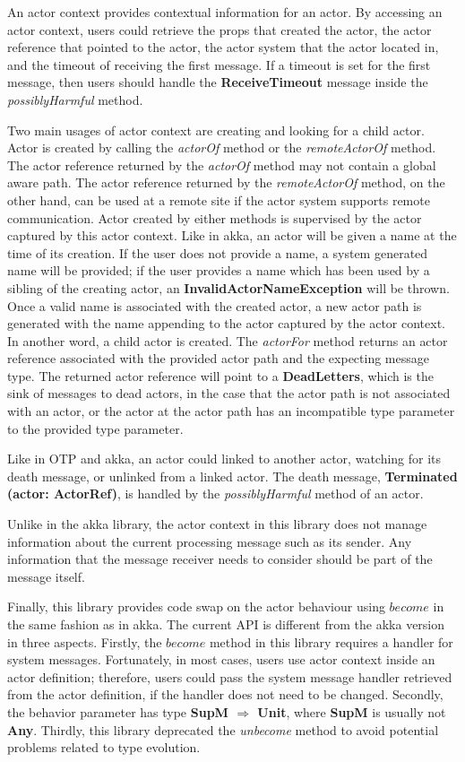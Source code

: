 An actor context provides contextual information for an actor.\cite{akka_api}  By accessing an actor context, users could retrieve the props that created the actor, the actor reference that pointed to the actor, the actor system that the actor located in, and the timeout of receiving the first message.  If a timeout is set for the first message, then users should handle the \textbf{ReceiveTimeout} message inside the \textit{possiblyHarmful} method.

Two main usages of actor context are creating and looking for a child actor.  Actor is created by calling the \textit{actorOf} method or the \textit{remoteActorOf} method.  The actor reference returned by the \textit{actorOf} method may not contain a global aware path.  The actor reference returned by the \textit{remoteActorOf} method, on the other hand, can be used at a remote site if the actor system supports remote communication.  Actor created by either methods is supervised by the actor captured by this actor context.  Like in akka, an actor will be given a name at the time of its creation.  If the user does not provide a name, a system generated name will be provided; if the user provides a name which has been used by a sibling of the creating actor, an \textbf{InvalidActorNameException} will be thrown.  Once a valid name is associated with the created actor, a new actor path is generated with the name appending to the actor captured by the actor context.  In another word, a child actor is created.  The \textit{actorFor} method returns an actor reference associated with the provided actor path and the expecting message type.  The returned actor reference will point to a \textbf{DeadLetters}, which is the sink of messages to dead actors, in the case that the actor path is not associated with an actor, or the actor at the actor path has an incompatible type parameter to the provided type parameter.

Like in OTP\cite{OTP} and akka\cite{akka_doc}, an actor could linked to another actor, watching for its death message, or unlinked from a linked actor.  The death message, \textbf{Terminated (actor: ActorRef)}, is handled by the \textit{possiblyHarmful} method of an actor.

Unlike in the akka library, the actor context in this library does not manage information about the current processing message such as its sender.  Any information that the message receiver needs to consider should be part of the message itself.

Finally, this library provides code swap on the actor behaviour using $become$ in the same fashion as in akka.  The current API is different from the akka version in three aspects.  Firstly, the $become$ method in this library requires a handler for system messages.  Fortunately, in most cases, users use actor context inside an actor definition; therefore, users could pass the system message handler retrieved from the actor definition, if the handler does not need to be changed.  Secondly, the behavior parameter has type \textbf{SupM $\Rightarrow$ Unit}, where \textbf{SupM} is usually not \textbf{Any}.  Thirdly, this library deprecated the \textit{unbecome} method to avoid potential problems related to type evolution.


